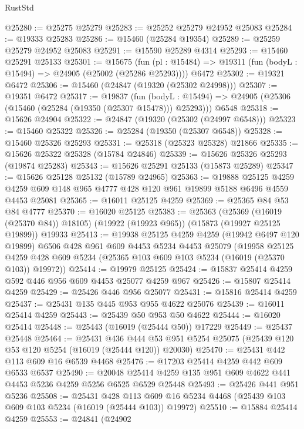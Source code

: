 \begin{lexlean}{RustStd}
\begin{coremodule}
@25280 := @25275 @25279
@25283 := @25252 @25279 @24952 @25083
@25284 := @19333 @25283
@25286 := @15460 (@25284 @19354)
@25289 := @25259 @25279 @24952 @25083
@25291 := @15590 @25289 @4314
@25293 := @15460 @25291 @25133
@25301 := @15675
    (fun (pl : @15484) => @19311 (fun (bodyL : @15494) => @24905 (@25002 (@25286 @25293))))
    @6472
@25302 := @19321 @6472
@25306 := @15460 (@24847 (@19320 (@25302 @24998)))
@25307 := @19351 @6472
@25317 := @19837
    (fun (bodyL : @15494) => @24905 (@25306 (@15460 (@25284 (@19350 (@25307 @15478))) @25293)))
    @6548
@25318 := @15626 @24904
@25322 := @24847 (@19320 (@25302 (@24997 @6548)))
@25323 := @15460 @25322
@25326 := @25284 (@19350 (@25307 @6548))
@25328 := @15460 @25326 @25293
@25331 := @25318 (@25323 @25328) @21866
@25335 := @15626 @25322 @25328 (@15784 @24846)
@25339 := @15626 @25326 @25293 (@19874 @25283)
@25343 := @15626 @25291 @25133 (@15873 @25289)
@25347 := @15626 @25128 @25132 (@15789 @24965)
@25363 := @19888
    @25125
    @4259
    @4259
    @609
    @148
    @965
    @4777
    @428
    @120
    @961
    @19899
    @5188
    @6496
    @4559
    @4453
    @25081
@25365 := @16011 @25125 @4259
@25369 := @25365 @84 @53 @84 @4777
@25370 := @16020 @25125
@25383 := @25363
    (@25369 (@16019 (@25370 @84)) @18105)
    (@19922 (@19923 @965))
    (@15873 (@19927 @25125 @19899))
    @19933
@25413 := @19938
    @25125
    @4259
    @4259
    (@19942 @6497 @120 @19899)
    @6506
    @428
    @961
    @609
    @4453
    @5234
    @4453
    @25079
    (@19958
      @25125
      @4259
      @428
      @609
      @5234
      (@25365 @103 @609 @103 @5234 (@16019 (@25370 @103)) @19972))
@25414 := @19979 @25125
@25424 := @15837 @25414 @4259 @592 @446 @956 @609 @4453 @25077 @4259 @967
@25426 := @15807 @25414 @4259
@25429 := @25426 @446 @956 @25077
@25431 := @15816 @25414 @4259
@25437 := @25431 @135 @445 @953 @955 @4622 @25076
@25439 := @16011 @25414 @4259
@25443 := @25439 @50 @953 @50 @4622
@25444 := @16020 @25414
@25448 := @25443 (@16019 (@25444 @50)) @17229
@25449 := @25437 @25448
@25464 := @25431
    @436
    @444
    @53
    @951
    @5254
    @25075
    (@25439 @120 @53 @120 @5254 (@16019 (@25444 @120)) @20030)
@25470 := @25431 @442 @113 @609 @16 @6539 @4468
@25476 := @17203 @25414 @4259 @442 @609 @6533 @6537
@25490 := @20048 @25414 @4259 @135 @951 @609 @4622 @441 @4453 @5236 @4259 @5256 @6525 @6529 @25448
@25493 := @25426 @441 @951 @5236
@25508 := @25431
    @428
    @113
    @609
    @16
    @5234
    @4468
    (@25439 @103 @609 @103 @5234 (@16019 (@25444 @103)) @19972)
@25510 := @15884 @25414 @4259
@25553 := @24841
    (@24902

\end{coremodule}
\end{lexlean}
